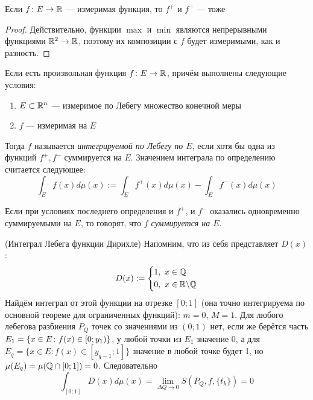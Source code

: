 \begin{proposition}
	Если $f \colon E \to \mathbb{R}$ --- измеримая функция, то $f^+$ и $f^-$ --- тоже
\end{proposition}

\begin{proof}
	Действительно, функции $\max$ и $\min$ являются непрерывными функциями $\mathbb{R}^2 \to \mathbb{R}$, поэтому их композиции с $f$ будет измеримыми, как и разность.
\end{proof}

\begin{definition}
	Если есть произвольная функция $f \colon E \to \mathbb{R}$, причём выполнены следующие условия:
	\begin{enumerate}
		\item $E \subset \mathbb{R}^n$ --- измеримое по Лебегу множество конечной меры
		
		\item $f$ --- измеримая на $E$
	\end{enumerate}
	Тогда $f$ называется \textit{интегрируемой по Лебегу по $E$}, если хотя бы одна из функций $f^+, f^-$ суммируется на $E$. Значением интеграла по определению считается следующее:
	\[
		\int_E f(x)d\mu(x) := \int_E f^+(x)d\mu(x) - \int_E f^-(x)d\mu(x)
	\]
\end{definition}

\begin{definition}
	Если при условиях последнего определения и $f^+$, и $f^-$ оказались одновременно суммируемыми на $E$, то говорят, что \textit{$f$ суммируется на $E$}.
\end{definition}

\begin{example} (Интеграл Лебега функции Дирихле)
	Напомним, что из себя представляет $D(x)$:
	\[
		D(x) := \left\{\begin{aligned}
			&{1,\ x \in \mathbb{Q}}
			\\
			&{0,\ x \in \mathbb{R} \backslash \mathbb{Q}}
		\end{aligned}\right.
	\]
	Найдём интеграл от этой функции на отрезке $[0; 1]$ (она точно интегрируема по основной теореме для ограниченных функций): $m = 0$, $M = 1$. Для любого лебегова разбиения $P_Q$ точек со значениями из $(0; 1)$ нет, если же берётся часть $E_1 = \{x \in E \colon f(x) \in \left[0; y_1\right)\}$, у любой точки из $E_1$ значение 0, а для $E_q = \{x \in E \colon f(x) \in [y_{q - 1}; 1]\}$ значение в любой точке будет 1, но $\mu(E_q) = \mu(\mathbb{Q} \cap [0; 1]) = 0$. Следовательно
	\[
		\int_{[0; 1]} D(x)d\mu(x) = \lim_{\Delta Q \to 0} S(P_Q, f, \{t_k\}) = 0
	\]
\end{example}

